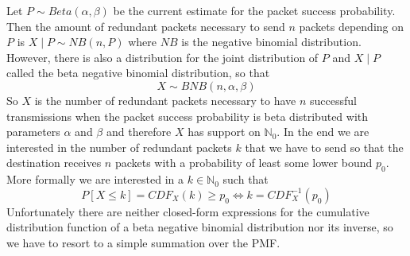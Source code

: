 \documentclass[10pt,a4paper]{article}
\begin{document}
Let $P \sim Beta(\alpha, \beta)$ be the current estimate for the packet success probability.
Then the amount of redundant packets necessary to send $n$ packets depending on $P$ is $X \mid P \sim NB(n, P)$ where $NB$ is the negative binomial distribution.
However, there is also a distribution for the joint distribution of $P$ and $X \mid P$ called the beta negative binomial distribution, so that
\begin{equation*}
  X \sim BNB(n, \alpha, \beta)
\end{equation*}
So $X$ is the number of redundant packets necessary to have $n$ successful transmissions when the packet success probability is beta distributed with parameters $\alpha$ and $\beta$ and therefore $X$ has support on $\mathbb{N}_{0}$.
In the end we are interested in the number of redundant packets $k$ that we have to send so that the destination receives $n$ packets with a probability of least some lower bound $p_{0}$.
More formally we are interested in a $k \in \mathbb{N}_{0}$ such that
\begin{equation*}
  P[X \le k] = CDF_{X}(k) \ge p_{0} \Leftrightarrow k = CDF_{X}^{-1}(p_{0})
\end{equation*}
Unfortunately there are neither closed-form expressions for the cumulative distribution function of a beta negative binomial distribution nor its inverse, so we have to resort to a simple summation over the PMF.
\end{document}

